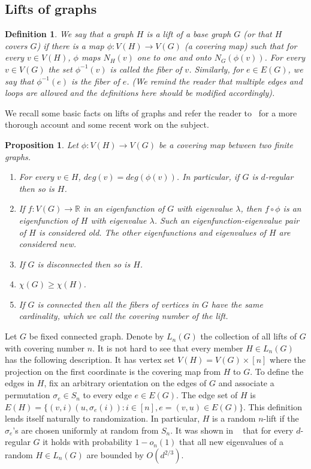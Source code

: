 \documentclass[12pt]{article}
\newtheorem{proposition}[theorem]{Proposition}
\newtheorem{open question}[theorem]{Open question}
\newtheorem{definition}[theorem]{Definition}
\begin{document}
\subsection{Lifts of graphs}\label{sub-se:lifts}
\begin{definition}
We say that a graph $H$ is a {\em lift} of {\em a base graph} $G$ (or that $H$ {\em covers} $G$) if there
is a map $\phi:V(H)\rightarrow V(G)$ (a {\em covering map}) such that for every $v\in V(H)$,
$\phi$ maps $N_H(v)$ one to one and onto $N_G(\phi(v))$.
For every $v \in V(G)$ the set $\phi^{-1}(v)$ is called the {\em fiber} of $v$. 
Similarly, for $e \in E(G)$, we say that $\phi^{-1}(e)$ is the fiber of $e$.
(We remind the reader that multiple edges and loops are allowed and the definitions here
should be modified accordingly).
\end{definition}
We recall some basic facts on lifts of graphs and refer the reader to~\cite{AL02,AL06,ALM02,LR05}
for a more thorough account and some recent work on the subject.
\begin{proposition}\label{lifts basic properties}
Let $\phi:V(H)\rightarrow V(G)$ be a covering map between two finite graphs.
\begin{enumerate}\label{pro:basic properties lifts}
\item For every $v \in H$, $deg(v)=deg(\phi(v))$. In particular, if $G$ is $d$-regular then so is $H$.
\item If $f:V(G)\rightarrow\mathbb{R}$ in an eigenfunction of $G$ with eigenvalue $\lambda$,
then $f\circ\phi$ is an eigenfunction of $H$ with eigenvalue $\lambda$.
Such an eigenfunction-eigenvalue pair of $H$ is considered {\em old}. 
The other eigenfunctions and eigenvalues of $H$ are considered {\em new}.
\item If $G$ is disconnected then so is $H$.
\item $\chi(G)\ge\chi(H)$.
\item If $G$ is connected then all the fibers of vertices in $G$ have the same cardinality,
which we call the {\em covering number} of the lift.
\end{enumerate}
\end{proposition}

Let $G$ be fixed connected graph. Denote by $L_n(G)$
the collection of all lifts of $G$ with covering number $n$.
It is not hard to see that every
member $H \in L_n(G)$ has the following description.
It has vertex set $V(H)=V(G)\times[n]$ where the projection on the first
coordinate is the covering map from $H$ to $G$. To define the edges in $H$,
fix an arbitrary orientation on the edges of $G$ and associate a permutation $\sigma_e \in S_n$ to every edge $e\in E(G)$.
The edge set of $H$ is $E(H)=\{ (v,i)(u,\sigma_e(i)) : i\in[n],e=(v,u)\in E(G)\}$. This definition
lends itself naturally to randomization. In particular, $H$ is
a random $n$-lift if the $\sigma_e$'s are chosen uniformly at random from $S_n$.
It was shown in ~\cite{LP09} that for every $d$-regular $G$ it holds with probability
$1-o_n(1)$ that all new eigenvalues of a random $H \in L_n(G)$ are bounded by $O(d^{2/3})$.
\end{document}
